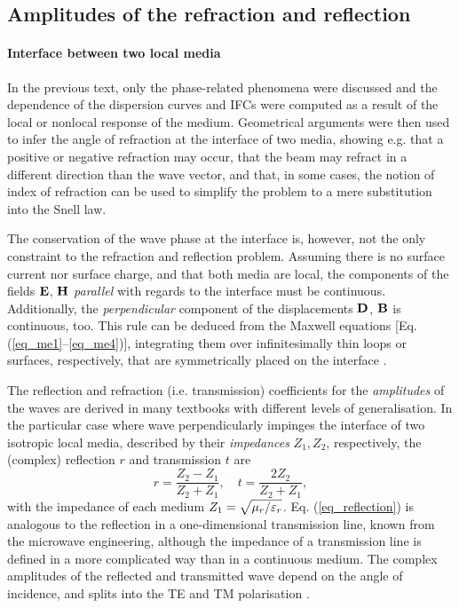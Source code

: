 \subsection{Amplitudes of the refraction and reflection}
\paragraph{Interface between two local media} %
In the previous text, only the phase-related phenomena were discussed and the dependence of the dispersion curves and IFCs were computed as a result of the local or nonlocal response of the medium. Geometrical arguments were then used to infer the angle of refraction at the interface of two media, showing e.g. that a positive or negative refraction may occur, that the beam may refract in a different direction than the wave vector, and that, in some cases, the notion of index of refraction can be used to simplify the problem to a mere substitution into the Snell law.

The conservation of the wave phase at the interface is, however, not the only constraint to the refraction and reflection problem. Assuming there is no surface current nor surface charge, and that both media are local, the components of the fields $\mathbf{E}$, $\mathbf{H}$ \textit{parallel} with regards to the interface must be continuous. Additionally, the \textit{perpendicular} component of the displacements $\mathbf{D}$, $\mathbf{B}$ is continuous, too. This rule can be deduced from the Maxwell equations [Eq.  (\ref{eq_me1}--\ref{eq_me4})], integrating them over infinitesimally thin loops or surfaces, respectively, that are symmetrically placed on the interface \cite[pp. 26-29]{klingshirn2007semiconductor}. 

The reflection and refraction (i.e. transmission) coefficients for the \textit{amplitudes} of the waves are derived in many textbooks  with different levels of generalisation.  
In the particular case where wave perpendicularly impinges the interface of two isotropic local media, described by their \textit{impedances} $Z_1, Z_2$, respectively, the (complex) reflection $r$ and transmission $t$ are
\begin{equation} r = \frac{Z_2 - Z_1}{Z_2+Z_1}, \quad t = \frac{2 Z_2}{Z_2 + Z_1}, \label{eq_reflection}\end{equation}
with the impedance of each medium $Z_{1} = \sqrt{\mu_r/\varepsilon_r}$.
Eq. (\ref{eq_reflection}) is analogous to the reflection in a one-dimensional transmission line, known from the microwave engineering, although the impedance of a transmission line is defined in a more complicated way than in a continuous medium.
The complex amplitudes of the reflected and transmitted wave depend on the angle of incidence, and splits into the TE and TM polarisation \cite[p. 38]{born1999book}.  %

